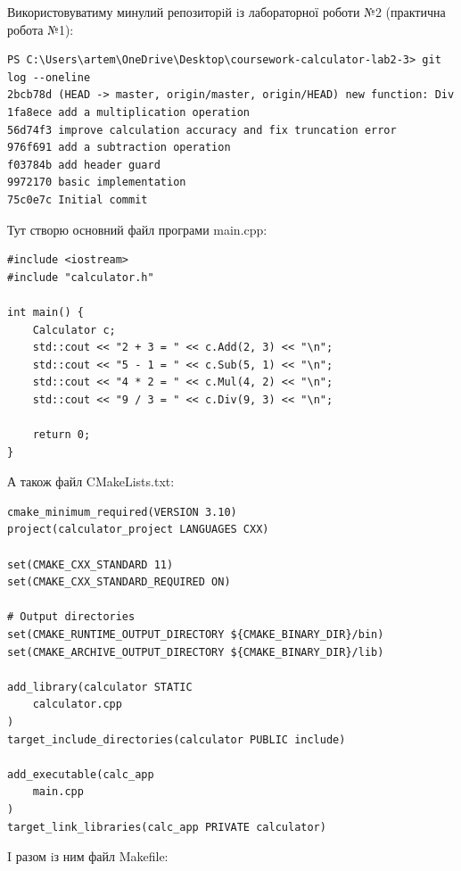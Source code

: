 \documentclass[12pt,a4paper]{article}
\begin{document}
    Використовуватиму минулий репозиторiй iз лабораторної роботи №2 (практична робота №1):
    \begin{verbatim}
PS C:\Users\artem\OneDrive\Desktop\coursework-calculator-lab2-3> git log --oneline
2bcb78d (HEAD -> master, origin/master, origin/HEAD) new function: Div
1fa8ece add a multiplication operation
56d74f3 improve calculation accuracy and fix truncation error
976f691 add a subtraction operation
f03784b add header guard
9972170 basic implementation
75c0e7c Initial commit
    \end{verbatim}

    Тут створю основний файл програми main.cpp:

    \begin{verbatim}
#include <iostream>
#include "calculator.h"

int main() {
    Calculator c;
    std::cout << "2 + 3 = " << c.Add(2, 3) << "\n";
    std::cout << "5 - 1 = " << c.Sub(5, 1) << "\n";
    std::cout << "4 * 2 = " << c.Mul(4, 2) << "\n";
    std::cout << "9 / 3 = " << c.Div(9, 3) << "\n";

    return 0;
}
    \end{verbatim}

    А також файл CMakeLists.txt:

    \begin{verbatim}
cmake_minimum_required(VERSION 3.10)
project(calculator_project LANGUAGES CXX)

set(CMAKE_CXX_STANDARD 11)
set(CMAKE_CXX_STANDARD_REQUIRED ON)

# Output directories
set(CMAKE_RUNTIME_OUTPUT_DIRECTORY ${CMAKE_BINARY_DIR}/bin)
set(CMAKE_ARCHIVE_OUTPUT_DIRECTORY ${CMAKE_BINARY_DIR}/lib)

add_library(calculator STATIC
    calculator.cpp
)
target_include_directories(calculator PUBLIC include)

add_executable(calc_app
    main.cpp
)
target_link_libraries(calc_app PRIVATE calculator)
    \end{verbatim}

    I разом iз ним файл Makefile:
\end{document}
